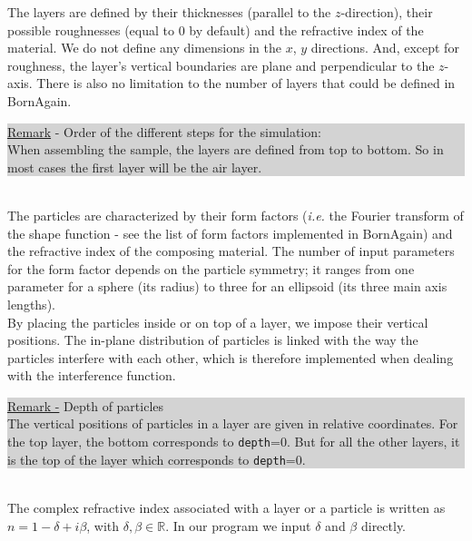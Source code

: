 \noindent The layers are defined by their thicknesses (parallel to the
$z$-direction), their possible
roughnesses (equal to 0 by default) and the refractive index of the
material. We do not define any dimensions in the $x$, $y$
directions. And, except for roughness, the layer's vertical boundaries are plane and
perpendicular to the $z$-axis. There is also no limitation to the
number of layers that could be defined in BornAgain.\\

\noindent {\huge\danger} 
\colorbox{Lightgray}{\parbox{\dimexpr\linewidth-8\fboxsep}
{\underline{Remark} - Order of the different steps for the simulation: \\
When assembling the sample, the layers are defined from top to
bottom. So in most cases the first layer will be the air layer.}}\\

\noindent The particles are characterized by their form factors (\textit{i.e.} the Fourier transform of the shape function - see the list of form factors implemented
  in BornAgain) and
the refractive index of the composing material. The number of input parameters for the form
  factor depends on the
  particle symmetry; it ranges from one parameter for a sphere (its
  radius) to three for an ellipsoid (its three main axis lengths).\\ By
  placing the particles
inside or on top of a layer, we impose their vertical positions. The in-plane distribution of particles is linked with the way the
particles interfere with each other, which is therefore implemented
when dealing with the interference function. \\

\noindent {\huge\danger} 
\colorbox{Lightgray}{\parbox{\dimexpr\linewidth-8\fboxsep}
{\underline{Remark -} Depth of particles\\
The vertical positions of particles in a layer are given in relative
coordinates. For the top layer, the bottom corresponds to
\texttt{depth}=0. But for all the other layers, it is the top of the
layer which corresponds to \texttt{depth}=0.}}\\


\noindent The complex refractive index associated with a layer or a particle is written as $n=1-\delta +i\beta$, with
$\delta, \beta \in \mathbb{R}$. In our program we input $\delta$ and
$\beta$ directly. \\


